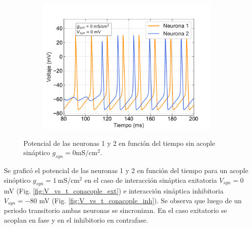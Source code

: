 \documentclass[11pt,twocolumn,twoside]{opticajnl}
\begin{document}
\begin{figure}[ht]
    \centering
         \begin{subfigure}[b]{\linewidth}
            \includegraphics[width=\textwidth]{Figuras/V_vs_t_0_0.pdf}
         \end{subfigure}
    \caption{Potencial de las neuronas 1 y 2 en función del tiempo sin acople sináptico $g_{syn} = 0 \text{mS}/\text{cm}^2$.} 
    \label{fig:V_vs_t_sinacople}
\end{figure}

Se graficó el potencial de las neuronas 1 y 2 en función del tiempo para un acople sinóptico $g_{syn} = 1~\text{mS}/\text{cm}^2$ en el caso de interacción sináptica exitatoria $V_{syn}=0 $ mV (Fig. \ref{fig:V_vs_t_conacople_ext}) e interacción sináptica inhibitoria $V_{syn}= -80$ mV (Fig. \ref{fig:V_vs_t_conacople_inh}). Se observa que luego de un periodo transitorio ambas neuronas se sincronizan. En el caso exitatorio se acoplan en fase y en el inhibitorio en contrafase.
\end{document}
